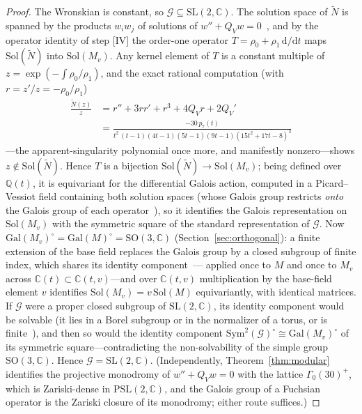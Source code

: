 \documentclass[cntp]{ipart}
\newcommand{\rmd}{\mathrm{d}}
\theoremstyle{plain}
\theoremstyle{remark}
\begin{document}
\begin{proof}
The Wronskian is constant, so $\mathcal{G}\subseteq\mathrm{SL}(2,\mathbb{C})$.
The solution space of $\widetilde N$ is spanned by the products $w_iw_j$ of solutions of
$w''+Q_Vw=0$~\cite{vdPutSinger}, and by the operator identity of step [IV] the order-one
operator $T=\rho_0+\rho_1\,\rmd/\rmd t$ maps $\mathrm{Sol}(\widetilde N)$ into
$\mathrm{Sol}(M_v)$. Any kernel element of $T$ is a constant multiple of
$z=\exp(-\!\int\!\rho_0/\rho_1)$, and the exact rational computation (with
$r=z'/z=-\rho_0/\rho_1$)
\begin{equation}
\begin{split}
\frac{\widetilde N(z)}{z}&=r''+3rr'+r^3+4Q_Vr+2Q_V'\\[2pt]
&=\frac{-30\,p_7(t)}{t^2\,(t-1)(4t-1)(5t-1)(9t-1)(15t^2+17t-8)^3}
\end{split}
\label{eq:Einj}
\end{equation}
---the apparent-singularity polynomial once more, and manifestly nonzero---shows
$z\notin\mathrm{Sol}(\widetilde N)$. Hence $T$ is a bijection
$\mathrm{Sol}(\widetilde N)\to\mathrm{Sol}(M_v)$; being defined over $\mathbb{Q}(t)$, it is
equivariant for the differential Galois action, computed in a Picard--Vessiot field containing
both solution spaces (whose Galois group restricts \emph{onto} the Galois group of each
operator~\cite{vdPutSinger}), so it identifies the Galois representation on
$\mathrm{Sol}(M_v)$ with the symmetric square of the standard representation of $\mathcal{G}$.
Now $\mathrm{Gal}(M_v)^\circ=\mathrm{Gal}(M)^\circ=\mathrm{SO}(3,\mathbb{C})$
(Section~\ref{sec:orthogonal}): a finite extension of the base field replaces the Galois group by
a closed subgroup of finite index, which shares its identity component~\cite{vdPutSinger}---
applied once to $M$ and once to $M_v$ across $\mathbb{C}(t)\subset\mathbb{C}(t,v)$---and over
$\mathbb{C}(t,v)$ multiplication by the base-field element $v$ identifies
$\mathrm{Sol}(M_v)=v\,\mathrm{Sol}(M)$ equivariantly, with identical matrices. If $\mathcal{G}$ were a
proper closed subgroup of $\mathrm{SL}(2,\mathbb{C})$, its identity component would be
solvable (it lies in a Borel subgroup or in the normalizer of a torus, or is
finite~\cite{Kovacic1986,vdPutSinger}), and then so would the identity component
$\mathrm{Sym}^2(\mathcal{G})^\circ\cong\mathrm{Gal}(M_v)^\circ$ of its symmetric
square---contradicting the non-solvability of the simple group $\mathrm{SO}(3,\mathbb{C})$.
Hence $\mathcal{G}=\mathrm{SL}(2,\mathbb{C})$. (Independently,
Theorem~\ref{thm:modular} identifies the projective monodromy of $w''+Q_Vw=0$ with the lattice
$\Gamma_0(30)^+$, which is Zariski-dense in $\mathrm{PSL}(2,\mathbb{C})$, and the Galois group
of a Fuchsian operator is the Zariski closure of its monodromy; either route suffices.)
\end{proof}
\end{document}
